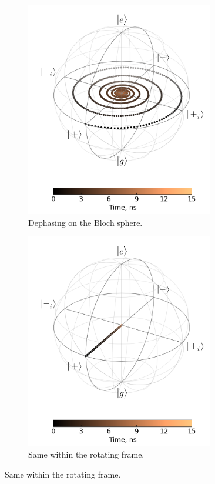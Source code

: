 \documentclass[12pt]{report}
\numberwithin{equation}{section}
\begin{document}
\begin{figure}
\centering
\begin{subfigure}[t]{0.45\textwidth}
\centering
\includegraphics[width=0.9\textwidth]{qdeph_bloch}
\caption{Dephasing on the Bloch sphere.}
\end{subfigure}
\begin{subfigure}[t]{0.45\textwidth}
\centering
\includegraphics[width=0.9\textwidth]{qdeph_bloch_rf}
\caption{Same within the rotating frame.}
\end{subfigure}


\end{figure}
\end{document}
